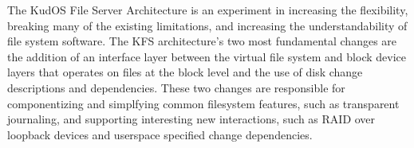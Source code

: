 The KudOS File Server Architecture is an experiment in increasing the
flexibility, breaking many of the existing limitations, and increasing
the understandability of file system software.  The KFS architecture's two most
fundamental changes are the addition of an interface layer between the
virtual file system and block device layers that operates on files at
the block level and the use of disk change descriptions and
dependencies. These two changes are responsible for componentizing and
simplfying common filesystem features, such as transparent journaling,
and supporting interesting new interactions, such as RAID over
loopback devices and userspace specified change dependencies.
